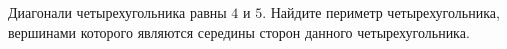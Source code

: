 \begin{ex}
	\begin{condition}
		Диагонали четырехугольника равны \( 4  \) и \( 5 \). Найдите периметр четырехугольника, вершинами которого являются середины сторон данного четырехугольника.
	\end{condition}
\end{ex}